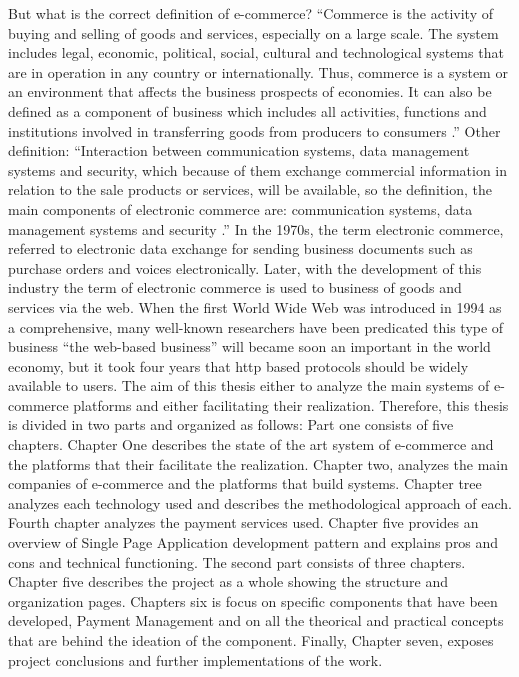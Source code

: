 But what is the correct definition of e-commerce?
\newline
“Commerce is the activity of buying and selling of goods and services, especially on a large scale. The system includes legal, economic, political, social, cultural and technological systems that are in operation in any country or internationally. Thus, commerce is a system or an environment that affects the business prospects of economies. It can also be defined as a component of business which includes all activities, functions and institutions involved in transferring goods from producers to consumers \cite{commerce_def_1}.”
\newline
Other definition:
“Interaction between communication systems, data management systems and security, which because of them exchange commercial information in relation to the sale products or services, will be available, so the definition, the main components of electronic commerce are: communication systems, data management systems and security \cite{commerce_def_2}.”
\newline
In the 1970s, the term electronic commerce, referred to electronic data exchange for sending business documents such as purchase orders and voices electronically. Later, with the development of this industry the term of electronic commerce is used to business of goods and services via the web. When the first World Wide Web was introduced in 1994 as a comprehensive, many well-known researchers have been predicated this type of business “the web-based business” will became soon an important in the world economy, but it took four years that http based protocols should be widely available to users.
The aim of this thesis either to analyze the main systems of e-commerce platforms and either facilitating their realization.
 \newline
Therefore, this thesis is divided in two parts and organized as follows:
Part one consists of five chapters. Chapter One describes the state of the art system of e-commerce and the platforms that their facilitate the realization. Chapter two, analyzes the main companies of e-commerce and the platforms that build systems. Chapter tree analyzes each technology used and describes the methodological approach of each. Fourth chapter analyzes the payment services used. Chapter five provides an overview of Single Page Application development pattern and explains pros and cons and technical functioning.
The second part consists of three chapters. Chapter five describes the project as a whole showing the structure and organization pages. Chapters six is focus on specific components that have been developed, Payment Management and on all the theorical and practical concepts that are behind the ideation of the component. Finally, Chapter seven, exposes project conclusions and further implementations of the work.